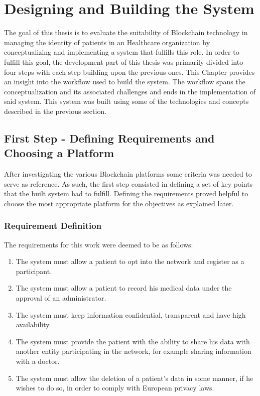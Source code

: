 \chapter{Designing and Building the System} \label{development}  

The goal of this thesis is to evaluate the suitability of Blockchain technology
in managing the identity of patients in an Healthcare organization by
conceptualizing and implementing a system that fulfills this role. In order to
fulfill this goal, the development part of this thesis was primarily divided
into four steps with each step building upon the previous ones. This Chapter
provides an insight into the workflow used to build the system. The workflow
spans the conceptualization and its associated challenges and ends in the
implementation of said system. This system was built using some of the
technologies and concepts described in the previous section.

\section{First Step - Defining Requirements and Choosing a 
	Platform}\label{choosingHyperledger}

After investigating the various Blockchain platforms some criteria was needed
to serve as reference. As such, the first step consisted in defining a set of
key points that the built system had to fulfill. Defining the requirements
proved helpful to choose the most appropriate platform for the objectives as
explained later.

\subsection{Requirement Definition}
The requirements for this work were deemed to be as follows:

\renewcommand{\labelenumi}{\Roman{enumi}.}
\begin{enumerate}
  \item The system must allow a patient to opt into the network and register as
    a participant.
  \item The system must allow a patient to record his medical data under the
    approval of an administrator.
  \item The system must keep information confidential, transparent and have
    high availability.
  \item The system must provide the patient with the ability to share his data
    with another entity participating in the network, for example sharing
    information with a doctor.
  \item The system must allow the deletion of a patient's data in some manner,
    if he wishes to do so, in order to comply with European privacy laws.
\end{enumerate}

